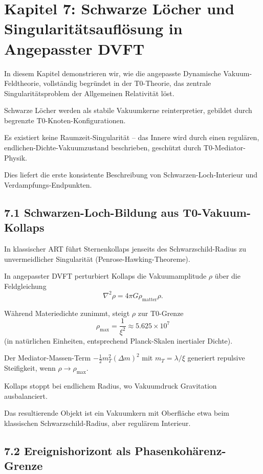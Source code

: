 	\section{Kapitel 7: Schwarze Löcher und Singularitätsauflösung in Angepasster DVFT}
	
	In diesem Kapitel demonstrieren wir, wie die angepasste Dynamische Vakuum-Feldtheorie, vollständig begründet in der T0-Theorie, das zentrale Singularitätsproblem der Allgemeinen Relativität löst.
	
	Schwarze Löcher werden als stabile Vakuumkerne reinterpretier, gebildet durch begrenzte T0-Knoten-Konfigurationen.
	
	Es existiert keine Raumzeit-Singularität – das Innere wird durch einen regulären, endlichen-Dichte-Vakuumzustand beschrieben, geschützt durch T0-Mediator-Physik.
	
	Dies liefert die erste konsistente Beschreibung von Schwarzen-Loch-Interieur und Verdampfungs-Endpunkten.
	
	\subsection{7.1 Schwarzen-Loch-Bildung aus T0-Vakuum-Kollaps}
	
	In klassischer ART führt Sternenkollaps jenseits des Schwarzschild-Radius zu unvermeidlicher Singularität (Penrose-Hawking-Theoreme).
	
	In angepasster DVFT perturbiert Kollaps die Vakuumamplitude $\rho$ über die Feldgleichung
	\[
	\nabla^2 \rho = 4\pi G \rho_{\text{matter}} \rho.
	\]
	
	Während Materiedichte zunimmt, steigt $\rho$ zur T0-Grenze
	\[
	\rho_{\text{max}} = \frac{1}{\xi^2} \approx 5.625 \times 10^7
	\]
	(in natürlichen Einheiten, entsprechend Planck-Skalen inertialer Dichte).
	
	Der Mediator-Massen-Term $-\frac{1}{2} m_T^2 (\Delta m)^2$ mit $m_T = \lambda / \xi$ generiert repulsive Steifigkeit, wenn $\rho \to \rho_{\text{max}}$.
	
	Kollaps stoppt bei endlichem Radius, wo Vakuumdruck Gravitation ausbalanciert.
	
	Das resultierende Objekt ist ein Vakuumkern mit Oberfläche etwa beim klassischen Schwarzschild-Radius, aber regulärem Interieur.
	
	\subsection{7.2 Ereignishorizont als Phasenkohärenz-Grenze}
	
